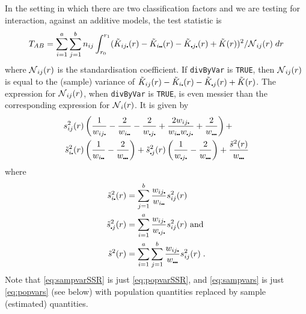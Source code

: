 \documentclass[12pt]{article}
\newcommand{\pt}{\mbox{\scalebox{0.4}{$\bullet$}}}
\newcommand{\tils}{\mbox{$\tilde{s}$}}
\newcommand{\sco}{\mbox{$\cal N$}}
\begin{document}
In the setting in which there are two classification factors and
we are testing for interaction, against an additive models, the
test statistic is
\[
T_{AB} = \sum_{i=1}^a \sum_{j=1}^b n_{ij} \int_{r_0}^{r_1} (\tilde{K}_{ij \pt}(r) -
   \tilde{K}_{i \pt \pt}(r) - \tilde{K}_{\pt j \pt}(r) +
   \tilde{K}(r))^2/\sco_{ij}(r) \; dr
\]
where $\sco_{ij}(r)$ is the standardisation coefficient.  If
\texttt{divByVar} is \texttt{TRUE}, then $\sco_{ij}(r)$ is equal to
the (sample) variance of $\tilde{K}_{ij}(r) - \tilde{K}_{i\pt}(r)
- \tilde{K}_{\pt j}(r) + \tilde{K}(r)$.  The expression for
$\sco_{ij}(r)$, when \texttt{divByVar} is \texttt{TRUE}, is
even messier than the corresponding expression for $\sco_{i}(r)$.
It is given by
\begin{equation}
\label{eq:sampvarSSR}
\begin{split}
s_{ij}^2(r) &\left ( \frac{1}{w_{i j \pt}} -
                                      \frac{2}{w_{i \pt \pt}} -
                                      \frac{2}{w_{\pt j \pt}} +
                                      \frac{2w_{ij \pt}}{w_{i \pt \pt} w_{\pt j \pt}} +
                                      \frac{2}{w_{\pt \pt \pt}} \right )+ \\
               \tils^2_{i \pt}(r) &\left ( \frac{1}{w_{i \pt \pt}} -
                                   \frac{2}{w_{\pt \pt \pt}} \right )+
               \tils^2_{\pt j}(r) \left (\frac{1}{w_{\pt j \pt}} -
                                   \frac{2}{w_{\pt \pt \pt}} \right )+
                            \frac{\tilde{s}^2(r)}{w_{\pt \pt \pt}}
\end{split}
\end{equation}
where
\begin{equation}
\label{eq:sampvars}
\begin{split}
\tils_{i \pt}^2(r) &= \sum_{j=1}^b \frac{w_{ij \pt}}{w_{i \pt \pt}} s^2_{ij}(r) \\
\tils_{\pt j}^2(r) &= \sum_{i=1}^a \frac{w_{ij \pt}}{w_{\pt j \pt}} s^2_{ij}(r)
                        \mbox{~and}\\
\tils^2(r) &= \sum_{i=1}^a \sum_{j=1}^b \frac{w_{i j \pt}}{w_{\pt \pt \pt}}
                                          s^2_{ij}(r) \; .
\end{split}
\end{equation}
Note that \eqref{eq:sampvarSSR} is just \eqref{eq:popvarSSR},
and \eqref{eq:sampvars} is just \eqref{eq:popvars} (see below)
with population quantities replaced by sample (estimated) quantities.
\end{document}
